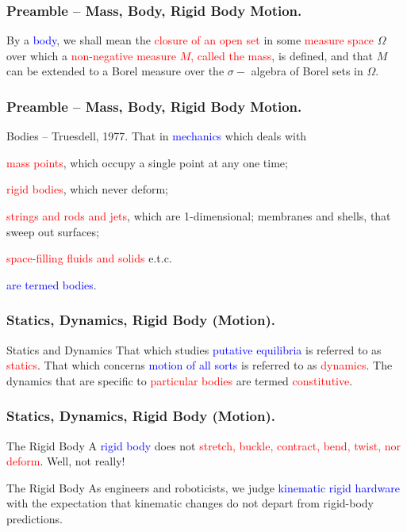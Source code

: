 \begin{frame}
	\frametitle{Preamble -- Mass, Body, Rigid Body Motion.}
	\begin{definition}
		By a \textcolor{blue}{body}, we shall mean the \textcolor{red}{closure of an open set} in some \textcolor{red}{measure space} $\Omega$ over which a \textcolor{red}{non-negative measure $M$, called the mass}, is defined, and that $M$ can be extended to a Borel measure over the $\sigma-$ algebra of Borel sets in $\Omega$.
	\end{definition}
\end{frame}

\begin{frame}
	\frametitle{Preamble -- Mass, Body, Rigid Body Motion.}
	\begin{block}{Bodies -- Truesdell, 1977.}
		That in \textcolor{blue}{mechanics} which deals with  \begin{inparaenum}[(i)]
			\item \textcolor{red}{mass points}, which occupy a single point at any one time;
			\item \textcolor{red}{rigid bodies}, which never deform;
			\item \textcolor{red}{strings and rods and jets}, which are 1-dimensional;  membranes and shells, that sweep out surfaces;
			\item \textcolor{red}{space-filling fluids and solids} e.t.c.
		\end{inparaenum}   
		\textcolor{blue}{are termed bodies}.
	\end{block}
\end{frame}


\begin{frame}
	\frametitle{Statics, Dynamics, Rigid Body (Motion).}
	\begin{block}{Statics and Dynamics}
		That which studies \textcolor{blue}{putative equilibria} is referred to as  \textcolor{red}{statics}. That which concerns  \textcolor{blue}{motion of all sorts} is referred to as  \textcolor{red}{dynamics}. The dynamics that are specific to  \textcolor{red}{particular bodies} are termed  \textcolor{red}{constitutive}.
	\end{block}
\end{frame}


\begin{frame}
	\frametitle{Statics, Dynamics, Rigid Body (Motion).}
	\begin{block}{The Rigid Body}
		A \textcolor{blue}{rigid body} does not \textcolor{red}{stretch, buckle, contract, bend, twist, nor deform}. Well, not really!
	\end{block}
	\begin{block}{The Rigid Body}
		As engineers and roboticists, we judge  \textcolor{blue}{kinematic rigid hardware} with the expectation that kinematic changes do not depart from rigid-body predictions.
	\end{block}
\end{frame}

